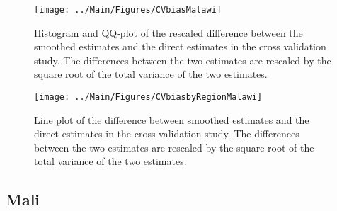 \documentclass[12pt]{article}\usepackage[]{graphicx}\usepackage[]{color}
\newenvironment{knitrout}{}{} %
\begin{document}
\begin{knitrout}
\color{fgcolor}\begin{figure}[bht]

{\centering \texttt{[image: ../Main/Figures/CVbiasMalawi]} 

}

\caption[Histogram and QQ-plot of the rescaled difference between the smoothed estimates and the direct estimates in the cross validation study]{Histogram and QQ-plot of the rescaled difference between the smoothed estimates and the direct estimates in the cross validation study. The differences between the two estimates are rescaled by the square root of the total variance of the two estimates.}\label{fig:unnamed-chunk-209}
\end{figure}


\end{knitrout}

\begin{knitrout}
\color{fgcolor}\begin{figure}[bht]

{\centering \texttt{[image: ../Main/Figures/CVbiasbyRegionMalawi]} 

}

\caption[Line plot of the difference between smoothed estimates and the direct estimates in the cross validation study]{Line plot of the difference between smoothed estimates and the direct estimates in the cross validation study. The differences between the two estimates are rescaled by the square root of the total variance of the two estimates.}\label{fig:unnamed-chunk-210}
\end{figure}


\end{knitrout}


\clearpage
\subsection{Mali}


\end{document}
